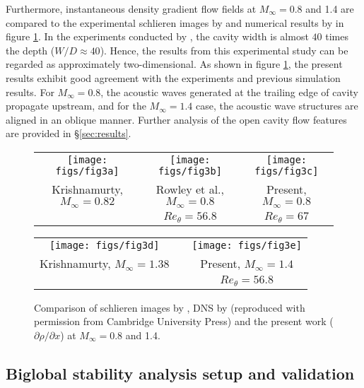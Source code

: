 \documentclass{jfm}
\begin{document}
Furthermore, instantaneous density gradient flow fields at $M_\infty=0.8$ and 1.4 are compared to the experimental schlieren images by \cite{Krishnamurty:1956} and numerical results by \cite{Rowley:JFM02} in figure \ref{fig:krish}. In the experiments conducted by \cite{Krishnamurty:1956}, the cavity width is almost $40$ times the depth ($W/D \approx 40$). Hence, the results from this experimental study can be regarded as approximately two-dimensional. As shown in figure \ref{fig:krish}, the present results exhibit good agreement with the experiments and previous simulation results. For $M_\infty = 0.8$, the acoustic waves generated at the trailing edge of cavity propagate upstream, and for the $M_\infty = 1.4$ case, the acoustic wave structures are aligned in an oblique manner. Further analysis of the open cavity flow features are provided in \S{\ref{sec:results}}. 
\begin{figure}
\begin{center}
{\scriptsize
  \begin{tabular}
      {ccc}
      \texttt{[image: figs/fig3a]}  &  \texttt{[image: figs/fig3b]} &
      \texttt{[image: figs/fig3c]} \\
       Krishnamurty, $M_\infty = 0.82$   &Rowley et al., $M_\infty = 0.8$ &Present, $M_\infty = 0.8$  \\   
                        & $Re_\theta = 56.8$  & $Re_\theta = 67$  
  \end{tabular}
  \begin{tabular}
      {ccc}
            \texttt{[image: figs/fig3d]}  & &%
      \texttt{[image: figs/fig3e]} \\ 
    Krishnamurty, $M_\infty = 1.38$ & & Present, $M_\infty = 1.4$  \\
                 &   & $Re_\theta = 56.8$  
  \end{tabular}
 }
\end{center}
   \caption{Comparison of schlieren images by \cite{Krishnamurty:1956}, DNS by \cite{Rowley:JFM02} (reproduced with permission from Cambridge University Press) and the present work ($\partial \rho/\partial x$) at $M_\infty = 0.8$ and 1.4.}
   \label{fig:krish}
\end{figure}

\subsection{Biglobal stability analysis setup and validation}
\end{document}
